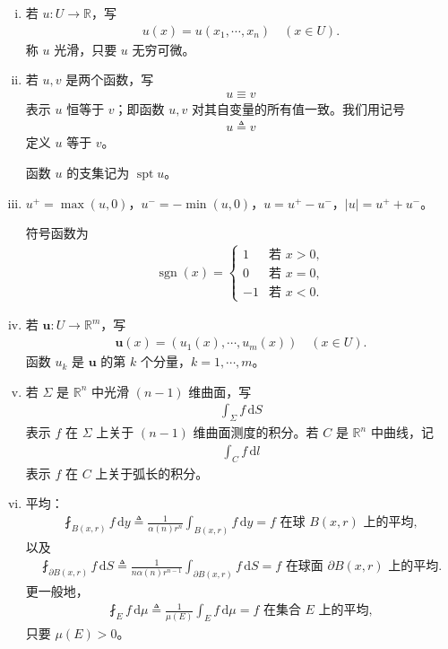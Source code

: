 \documentclass[../main.tex]{subfiles}
\begin{document}
\begin{enumerate}[(i)]
\item 若 $u:U\to\mathbb{R}$，写
\begin{align*}
u(x)=u(x_1,\cdots,x_n) \quad (x\in U).
\end{align*}
称 $u$ 光滑，只要 $u$ 无穷可微。

\item 若 $u,v$ 是两个函数，写
\begin{align*}
u\equiv v
\end{align*}
表示 $u$ 恒等于 $v$；即函数 $u,v$ 对其自变量的所有值一致。我们用记号
\begin{align*}
u\triangleq v
\end{align*}
定义 $u$ 等于 $v$。

函数 $u$ 的支集记为 $\operatorname{spt}u$。

\item $u^+=\max(u,0)$，$u^-=-\min(u,0)$，$u=u^+-u^-$，$|u|=u^++u^-$。

符号函数为
\begin{align*}
\operatorname{sgn}(x)=
\begin{cases}
1 & \text{若 } x>0,\\
0 & \text{若 } x=0,\\
-1 & \text{若 } x<0.
\end{cases}
\end{align*}

\item 若 $\mathbf{u}:U\to\mathbb{R}^m$，写
\begin{align*}
\mathbf{u}(x)=(u_1(x),\cdots,u_m(x)) \quad (x\in U).
\end{align*}
函数 $u_k$ 是 $\mathbf{u}$ 的第 $k$ 个分量，$k=1,\cdots,m$。

\item 若 $\Sigma$ 是 $\mathbb{R}^n$ 中光滑 $(n-1)$ 维曲面，写
\begin{align*}
\int_\Sigma f\,\mathrm{d}S
\end{align*}
表示 $f$ 在 $\Sigma$ 上关于 $(n-1)$ 维曲面测度的积分。若 $C$ 是 $\mathbb{R}^n$ 中曲线，记
\begin{align*}
\int_C f\,\mathrm{d}l
\end{align*}
表示 $f$ 在 $C$ 上关于弧长的积分。

\item 平均：
\begin{align*}
\fint_{B(x,r)}f\,\mathrm{d}y\triangleq\frac{1}{\alpha(n)r^n}\int_{B(x,r)}f\,\mathrm{d}y=f \text{ 在球 } B(x,r) \text{ 上的平均},
\end{align*}
以及
\begin{align*}
\fint_{\partial B(x,r)}f\,\mathrm{d}S\triangleq\frac{1}{n\alpha(n)r^{n-1}}\int_{\partial B(x,r)}f\,\mathrm{d}S=f \text{ 在球面 } \partial B(x,r) \text{ 上的平均}.
\end{align*}
更一般地，
\begin{align*}
\fint_E f\,\mathrm{d}\mu\triangleq\frac{1}{\mu(E)}\int_E f\,\mathrm{d}\mu=f \text{ 在集合 } E \text{ 上的平均},
\end{align*}
只要 $\mu(E)>0$。


\end{enumerate}
\end{document}
